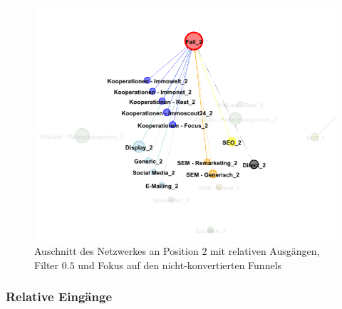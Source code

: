\begin{figure}[H]
	\centering\includegraphics[scale=0.4]{out_filter_50_fail.png}\caption{Auschnitt des Netzwerkes an Position $2$ mit relativen Ausgängen, Filter $0.5$ und Fokus auf den nicht-konvertierten Funnels}\label{out_filter_50_fail}
\end{figure}

\subsubsection*{Relative Eingänge}

